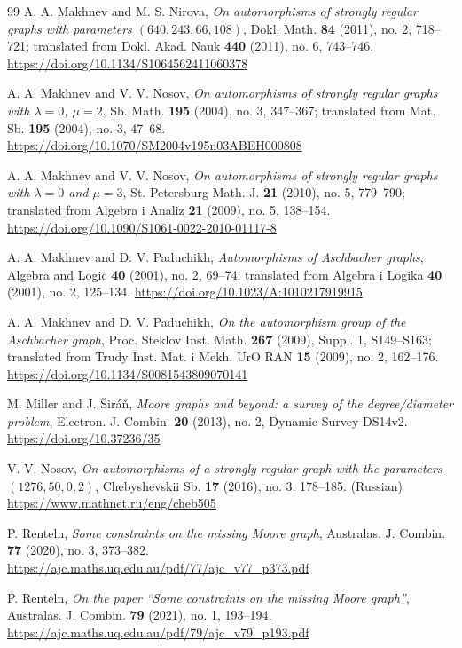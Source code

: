 \documentclass[11pt]{article}
\theoremstyle{plain}
\theoremstyle{remark}
\begin{document}
\begin{thebibliography}{99}
A. A. Makhnev and M. S. Nirova,
\emph{On automorphisms of strongly regular graphs with parameters $(640, 243, 66, 108)$},
Dokl. Math. \textbf{84} (2011), no. 2, 718--721;
translated from Dokl. Akad. Nauk \textbf{440} (2011), no. 6, 743--746.
\url{https://doi.org/10.1134/S1064562411060378}

A. A. Makhnev and V. V. Nosov,
\emph{On automorphisms of strongly regular graphs with $\lambda=0$, $\mu=2$},
Sb. Math. \textbf{195} (2004), no. 3, 347--367;
translated from Mat. Sb. \textbf{195} (2004), no. 3, 47--68.
\url{https://doi.org/10.1070/SM2004v195n03ABEH000808}

A. A. Makhnev and V. V. Nosov,
\emph{On automorphisms of strongly regular graphs with $\lambda=0$ and $\mu=3$},
St. Petersburg Math. J. \textbf{21} (2010), no. 5, 779--790;
translated from Algebra i Analiz \textbf{21} (2009), no. 5, 138--154.
\url{https://doi.org/10.1090/S1061-0022-2010-01117-8}

A. A. Makhnev and D. V. Paduchikh,
\emph{Automorphisms of Aschbacher graphs},
Algebra and Logic \textbf{40} (2001), no. 2, 69--74;
translated from Algebra i Logika \textbf{40} (2001), no. 2, 125--134.
\url{https://doi.org/10.1023/A:1010217919915}

A. A. Makhnev and D. V. Paduchikh,
\emph{On the automorphism group of the Aschbacher graph},
Proc. Steklov Inst. Math. \textbf{267} (2009), Suppl. 1, S149--S163;
translated from Trudy Inst. Mat. i Mekh. UrO RAN \textbf{15} (2009), no. 2, 162--176.
\url{https://doi.org/10.1134/S0081543809070141}

M. Miller and J. \v{S}ir\'a\v{n},
\emph{Moore graphs and beyond: a survey of the degree/diameter problem},
Electron. J. Combin. \textbf{20} (2013), no. 2, Dynamic Survey DS14v2.
\url{https://doi.org/10.37236/35}

V. V. Nosov,
\emph{On automorphisms of a strongly regular graph with the parameters $(1276,50,0,2)$},
Chebyshevskii Sb. \textbf{17} (2016), no. 3, 178--185. (Russian)
\url{https://www.mathnet.ru/eng/cheb505}

P. Renteln,
\emph{Some constraints on the missing Moore graph},
Australas. J. Combin. \textbf{77} (2020), no. 3, 373--382.
\url{https://ajc.maths.uq.edu.au/pdf/77/ajc_v77_p373.pdf}

P. Renteln,
\emph{On the paper ``Some constraints on the missing Moore graph''},
Australas. J. Combin. \textbf{79} (2021), no. 1, 193--194.
\url{https://ajc.maths.uq.edu.au/pdf/79/ajc_v79_p193.pdf}


\end{thebibliography}
\end{document}
